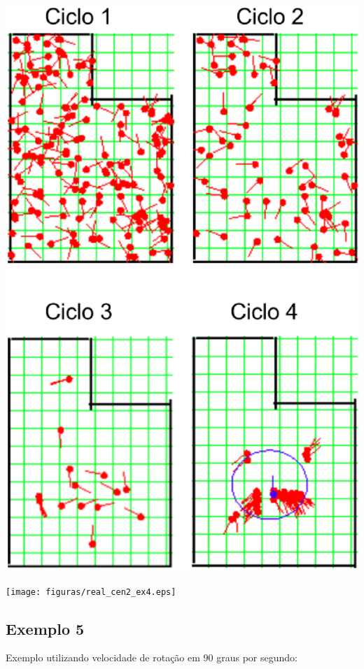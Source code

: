 {\centering
\includegraphics[scale=0.4]{figuras/cen2_ex4.eps}
\label{img:cen2_ex4}
\par}

{\centering
\texttt{[image: figuras/real\_cen2\_ex4.eps]}
\label{img:real_cen2_ex4}
\par}

\subsection{Exemplo 5}

Exemplo utilizando velocidade de rotação em 90 graus por segundo:

